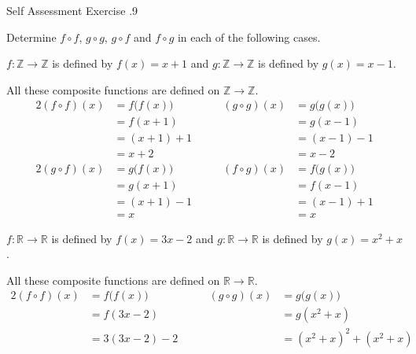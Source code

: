 \documentclass[\main/notes.tex]{subfiles}
\begin{document}
			\begin{exercise}{Self Assessment Exercise \thechapter.9}
				\begin{questions}
					\item Determine $f \circ f$, $g \circ g$, $g \circ f$ and $f \circ g$ in each of the following cases.
						\begin{questions}
							\item $f: \mathbb{Z} \rightarrow \mathbb{Z}$ is defined by $f(x) = x + 1$ and $g: \mathbb{Z} \rightarrow \mathbb{Z}$ is defined by $g(x) = x - 1$.\\
								\begin{answer}
									All these composite functions are defined on $\mathbb{Z} \rightarrow \mathbb{Z}$.
									\begin{alignat*}{2}
										(f \circ f)(x) &= f\bigl(f(x)\bigr) \qquad & (g \circ g)(x) &= g\bigl(g(x)\bigr)\\
										&= f(x + 1) \qquad & &= g(x - 1)\\
										&= (x + 1) + 1 \qquad & &= (x - 1) - 1\\
										&= x + 2 \qquad & &= x - 2
									\end{alignat*}
									\begin{alignat*}{2}
										(g \circ f)(x) &= g\bigl(f(x)\bigr) \qquad & (f \circ g)(x) &= f\bigl(g(x)\bigr)\\
										&= g(x + 1) \qquad & &= f(x - 1)\\
										&= (x + 1) - 1 \qquad & &= (x - 1) + 1\\
										&= x \qquad & &= x
									\end{alignat*}
								\end{answer}
							\item $f: \mathbb{R} \rightarrow \mathbb{R}$ is defined by $f(x) = 3x - 2$ and $g: \mathbb{R} \rightarrow \mathbb{R}$ is defined by $g(x) = x^{2} + x$.\\
								\begin{answer}
									All these composite functions are defined on $\mathbb{R} \rightarrow \mathbb{R}$.
									\begin{alignat*}{2}
										(f \circ f)(x) &= f\bigl(f(x)\bigr) \qquad & (g \circ g)(x) &= g\bigl(g(x)\bigr)\\
										&= f(3x - 2) \qquad & &= g\left(x^{2} + x\right)\\
										&= 3(3x - 2) - 2 \qquad & &= \left(x^{2} + x\right)^{2} + \left(x^{2} + x\right)\\

\end{alignat*}
\end{answer}
\end{questions}
\end{questions}
\end{exercise}
\end{document}

